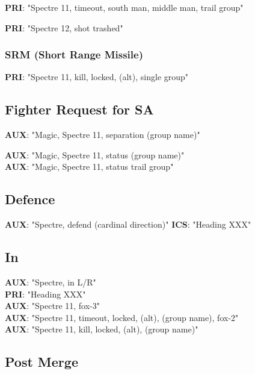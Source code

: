 \textbf{PRI}: "Spectre 11, timeout, south man, middle man, trail group"

\textbf{PRI}: "Spectre 12, shot trashed"

\subsubsection*{SRM (Short Range Missile)}

\textbf{PRI}: "Spectre 11, kill, locked, (alt), single group"

\subsection*{Fighter Request for SA}

\textbf{AUX}: "Magic, Spectre 11, separation (group name)"

\textbf{AUX}: "Magic, Spectre 11, status (group name)" \\
\textbf{AUX}: "Magic, Spectre 11, status trail group"

\subsection*{Defence}

\textbf{AUX}: "Spectre, defend (cardinal direction)"
\textbf{ICS}: "Heading XXX"

\subsection*{In}

\textbf{AUX}: "Spectre, in L/R" \\
\textbf{PRI}: "Heading XXX" \\
\textbf{AUX}: "Spectre 11, fox-3"\\
\textbf{AUX}: "Spectre 11, timeout, locked, (alt), (group name), fox-2"\\
\textbf{AUX}: "Spectre 11, kill, locked, (alt), (group name)"

\subsection*{Post Merge}

